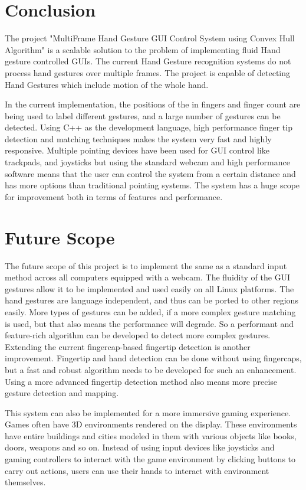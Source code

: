 \documentclass[11pt]{report}
\begin{document}
\chapter{Conclusion}

The project "MultiFrame Hand Gesture GUI Control System using Convex Hull Algorithm" is a scalable solution to the problem of implementing fluid Hand gesture controlled GUIs. The current Hand Gesture recognition systems do not process hand gestures over multiple frames. The project is capable of detecting Hand Gestures which include motion of the whole hand.

In the current implementation, the positions of the in fingers and finger count are being used to label different gestures, and a large number of gestures can be detected. Using C++ as the development language, high performance finger tip detection and matching techniques makes the system very fast and highly responsive. Multiple pointing devices have been used for GUI control like trackpads, and joysticks but using the standard webcam and high performance software means that the user can control the system from a certain distance and has more options than traditional pointing systems. The system has a huge scope for improvement both in terms of features and performance.
    
\chapter{Future Scope}

The future scope of this project is to implement the same as a standard input method across all computers equipped with a webcam. The fluidity of the GUI gestures allow it to be implemented and used easily on all Linux platforms. The hand gestures are language independent, and thus can be ported to other regions easily. More types of gestures can be added, if a more complex gesture matching is used, but that also means the performance will degrade. So a performant and feature-rich algorithm can be developed to detect more complex gestures. Extending the current fingercap-based fingertip detection is another improvement. Fingertip and hand detection can be done without using fingercaps, but a fast and robust algorithm needs to be developed for such an enhancement. Using a more advanced fingertip detection method also means more precise gesture detection and mapping.


This system can also be implemented for a more immersive gaming experience. Games often have 3D environments rendered on the display. These environments have entire buildings and cities modeled in them with various objects like books, doors, weapons and so on. Instead of using input devices like joysticks and gaming controllers to interact with the game environment by clicking buttons to carry out actions, users can use their hands to interact with environment themselves.
\end{document}
